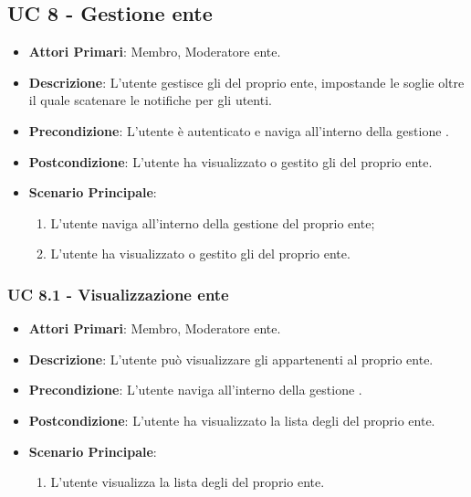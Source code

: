 	\subsection{UC 8 - Gestione  ente}
			
		\begin{itemize}
			\item \textbf{Attori Primari}: Membro, Moderatore ente.
			\item \textbf{Descrizione}: L'utente gestisce gli  del proprio ente, impostande le soglie oltre il quale scatenare le notifiche per gli utenti.
			\item \textbf{Precondizione}: L'utente è autenticato e naviga all'interno della gestione .
			\item \textbf{Postcondizione}: L'utente ha visualizzato o gestito gli  del proprio ente.
			\item \textbf{Scenario Principale}:
			\begin{enumerate}
				\item{L'utente naviga all'interno della gestione  del proprio ente;}
				\item{L'utente ha visualizzato o gestito gli  del proprio ente.}
			\end{enumerate}	
		\end{itemize}
			
			\subsubsection{UC 8.1 - Visualizzazione  ente}
			\begin{itemize}
				\item \textbf{Attori Primari}: Membro, Moderatore ente.
				\item \textbf{Descrizione}: L'utente può visualizzare gli  appartenenti al proprio ente.
				\item \textbf{Precondizione}: L'utente naviga all'interno della gestione .
				\item \textbf{Postcondizione}: L'utente ha visualizzato la lista degli  del proprio ente.
				\item \textbf{Scenario Principale}:
				\begin{enumerate}
					\item{L'utente visualizza la lista degli  del proprio ente.}
				\end{enumerate}	
			\end{itemize}
			
